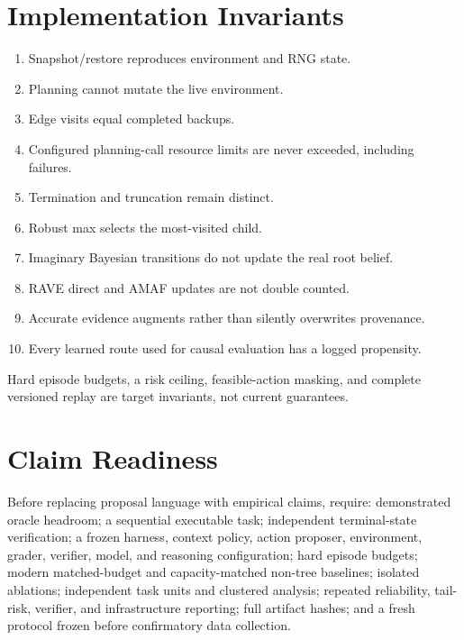 \documentclass[10pt,twocolumn]{article}
\begin{document}
\section{Implementation Invariants}

\begin{enumerate}[leftmargin=1.4em,itemsep=0.15em]
    \item Snapshot/restore reproduces environment and RNG state.
    \item Planning cannot mutate the live environment.
    \item Edge visits equal completed backups.
    \item Configured planning-call resource limits are never exceeded, including failures.
    \item Termination and truncation remain distinct.
    \item Robust max selects the most-visited child.
    \item Imaginary Bayesian transitions do not update the real root belief.
    \item RAVE direct and AMAF updates are not double counted.
    \item Accurate evidence augments rather than silently overwrites provenance.
    \item Every learned route used for causal evaluation has a logged propensity.
\end{enumerate}

Hard episode budgets, a risk ceiling, feasible-action masking, and complete
versioned replay are target invariants, not current guarantees.

\section{Claim Readiness}

Before replacing proposal language with empirical claims, require: demonstrated
oracle headroom; a sequential executable task; independent terminal-state
verification; a frozen harness, context policy, action proposer, environment,
grader, verifier, model, and reasoning configuration; hard episode budgets;
modern matched-budget and capacity-matched non-tree baselines; isolated
ablations; independent task units and clustered analysis; repeated reliability,
tail-risk, verifier, and infrastructure reporting; full artifact hashes; and a
fresh protocol frozen before confirmatory data collection.

\balance


\end{document}
